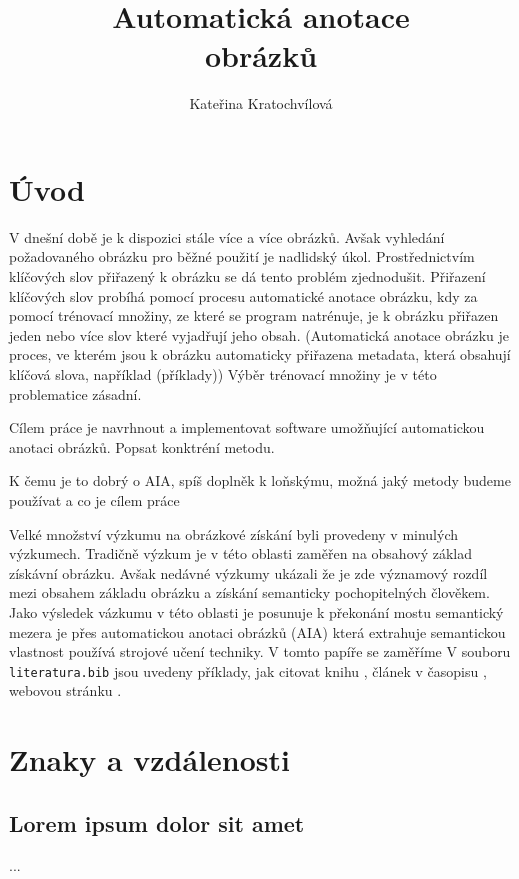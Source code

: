 \documentclass[czech,BP]{thesiskiv}
\author{Kateřina Kratochvílová}
\title{Automatická anotace\\obrázků}
\begin{document}
%
\maketitle
\tableofcontents

\chapter{Úvod}

V dnešní době je k dispozici stále více a více obrázků. Avšak vyhledání požadovaného obrázku pro běžné použití je nadlidský úkol. Prostřednictvím klíčových slov přiřazený k obrázku se dá tento problém zjednodušit. Přiřazení klíčových slov probíhá pomocí procesu automatické anotace obrázku, kdy za pomocí trénovací množiny, ze které se program natrénuje, je k obrázku přiřazen jeden nebo více slov které vyjadřují jeho obsah. (Automatická anotace obrázku je proces, ve kterém jsou k obrázku automaticky přiřazena metadata, která obsahují klíčová slova, například (příklady)) Výběr trénovací množiny je v této problematice zásadní. 

Cílem práce je navrhnout a implementovat software umožňující automatickou anotaci obrázků. Popsat konktréní metodu.



K čemu je to dobrý o AIA, spíš doplněk k loňskýmu, možná jaký metody budeme používat a co je cílem práce


Velké množství výzkumu na obrázkové získání byli provedeny v minulých výzkumech. Tradičně výzkum je v této oblasti zaměřen na obsahový základ získávní obrázku. Avšak nedávné výzkumy ukázali že je zde významový rozdíl mezi obsahem základu obrázku a získání semanticky pochopitelných člověkem. Jako výsledek vázkumu v této oblasti je posunuje k překonání mostu semantický mezera je přes automatickou anotaci obrázků (AIA) která extrahuje semantickou vlastnost používá strojové učení techniky. V tomto papíře se zaměříme 
V souboru \texttt{literatura.bib} jsou uvedeny příklady, jak citovat knihu \cite{KnuthAOCP2}, článek v časopisu \cite{Hoare1961}, webovou stránku \cite{Graphics2D}.
 
% 
%

{\raggedright\small

}

\chapter{Znaky a vzdálenosti}
\section{Lorem ipsum dolor sit amet}
...
\end{document}
